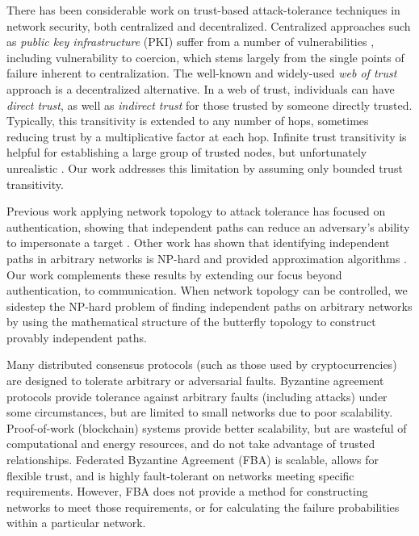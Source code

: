 \documentclass[10pt,letterpaper]{article}
\begin{document}
There has been considerable work on trust-based attack-tolerance techniques
in network security, both centralized and decentralized.
Centralized approaches such as {\em public key infrastructure} (PKI)
suffer from a number of vulnerabilities
\cite{ellison_ten_2000}, including vulnerability to coercion,
which stems largely from the single points of failure inherent to
centralization.
The well-known and widely-used {\em web of trust} approach
\cite{zimmermann_official_1995,richters_trust_2011}
is a decentralized alternative.
In a web of trust,
individuals can have {\em direct trust},
as well as {\em indirect trust} for those trusted by someone directly trusted.
Typically, this transitivity is extended to any number of hops,
sometimes reducing trust by a multiplicative factor at each hop.
Infinite trust transitivity is helpful for establishing a large group of
trusted nodes, but unfortunately unrealistic
\cite{christianson_why_1997}.
Our work addresses this limitation by assuming only
bounded trust transitivity.

Previous work applying network topology to attack tolerance has
focused on authentication,
showing that independent paths can reduce an adversary's ability
to impersonate a target
\cite{levien_attack-resistant_2009}.
Other work has shown that identifying independent paths in arbitrary networks
is NP-hard and provided approximation algorithms
\cite{reiter_resilient_1998}.
Our work complements these results by extending our focus beyond authentication,
to communication.
When network topology can be controlled, we sidestep the NP-hard problem of finding
independent paths on arbitrary networks by using the mathematical structure of
the butterfly topology to construct provably independent paths.

Many distributed consensus protocols (such as those used by cryptocurrencies)
are designed to tolerate arbitrary or adversarial faults.
Byzantine agreement protocols
\cite{lamport_byzantine_1982,castro_practical_1999}
provide tolerance against arbitrary faults (including attacks) under
some circumstances, but are limited to small networks due to poor scalability.
Proof-of-work \cite{dwork_pricing_1993,nakamoto_bitcoin:_2008} (blockchain)
systems provide better scalability,
but are wasteful of computational and energy resources,
and do not take advantage of trusted relationships.
Federated Byzantine Agreement (FBA) \cite{mazieres_stellar_2015}
is scalable, allows for flexible trust,
and is highly fault-tolerant on networks meeting specific requirements.
However, FBA does not provide a method for constructing networks to meet
those requirements,
or for calculating the failure probabilities within a particular network.
\end{document}
